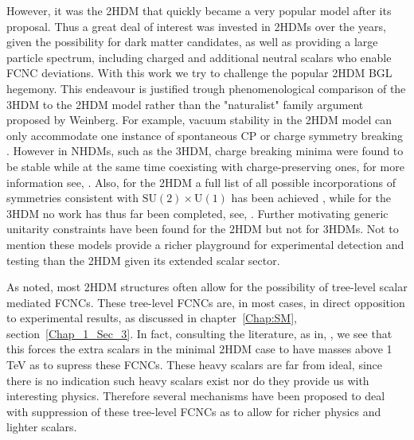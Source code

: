 
However, it was the 2HDM that quickly became a very popular model after its proposal. 
%
Thus a great deal of interest was invested in 2HDMs over the years, given the possibility for dark matter candidates, as well as providing a large particle spectrum, including charged and additional neutral scalars who enable FCNC deviations.
%
With this work we try to challenge the popular 2HDM BGL hegemony.
%
This endeavour is justified trough phenomenological comparison of the 3HDM to the 2HDM model rather than  the "naturalist" family argument proposed by Weinberg.
%
For example, vacuum stability in the 2HDM model can only accommodate one instance of spontaneous CP or charge symmetry breaking \cite{Branco_2012,Ferreira_2004,Barroso_2007}. 
%
However in NHDMs, such as the 3HDM, charge breaking minima were found to be stable while at the same time coexisting with charge-preserving ones, for more information see, \cite{Barroso_2006}.   
%
Also, for the 2HDM a full list of all possible incorporations of symmetries consistent with $\mathrm{SU(2)}\times\mathrm{U(1)}$ has been achieved \cite{Ivanov_2008,Ivanov2007}, while for the 3HDM no work has thus far been completed, see, \cite{Ivanov_2012,Ivanov_2015}. 
%
Further motivating generic unitarity constraints have been found for the 2HDM \cite{Ginzburg_2005} but not for 3HDMs. 
%
Not to mention these models provide a richer playground for experimental detection and testing than the 2HDM given its extended scalar sector. 

As noted, most 2HDM structures often allow for the possibility of tree-level scalar mediated FCNCs. 
%
These tree-level FCNCs are, in most cases, in direct opposition to experimental results, as discussed in chapter~\ref{Chap:SM}, section~\ref{Chap_1_Sec_3}. 
%
In fact, consulting the literature, as in, \cite{Branco:1999fs}, we see that this forces the extra scalars in the minimal 2HDM case to have masses above 1 TeV as to supress these FCNCs.
%
These heavy scalars are far from ideal, since there is no indication such heavy scalars exist nor do they provide us with interesting physics. 
%
Therefore several mechanisms have been proposed to deal with suppression of these tree-level FCNCs as to allow for richer physics and lighter scalars. 

